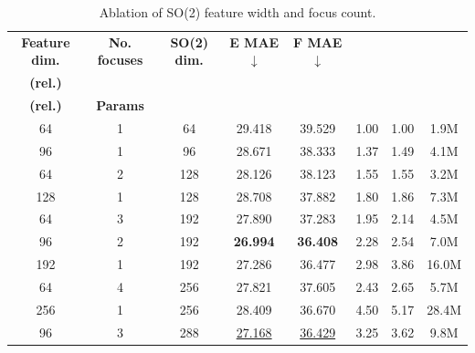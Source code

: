 \begin{table}[ht]
    \PaperTableStyle
    \begin{threeparttable}
        \caption{Ablation of SO(2) feature width and focus count.}
        \label{tab:dpa4_focus_ablation}
        \begin{tabular*}{\linewidth}{@{\extracolsep{\fill}}cccccccc@{}}
            \toprule
            \textbf{Feature dim.}                  &
            \textbf{No. focuses}                   &
            \textbf{SO(2) dim.}                    &
            \textbf{E MAE}$\downarrow$\tnote{a}    &
            \textbf{F MAE}$\downarrow$\tnote{a}    &
            \makecell{\textbf{Train time}\\\textbf{(rel.)}}$\downarrow$\tnote{b} &
            \makecell{\textbf{Test time}\\\textbf{(rel.)}}$\downarrow$\tnote{b}  &
            \textbf{Params}                                                                                                  \\
            \midrule
            64                                     & 1 & 64  & 29.418             & 39.529             & 1.00 & 1.00 & 1.9M  \\
            96                                     & 1 & 96  & 28.671             & 38.333             & 1.37 & 1.49 & 4.1M  \\
            64                                     & 2 & 128 & 28.126             & 38.123             & 1.55 & 1.55 & 3.2M  \\
            128                                    & 1 & 128 & 28.708             & 37.882             & 1.80 & 1.86 & 7.3M  \\
            64                                     & 3 & 192 & 27.890             & 37.283             & 1.95 & 2.14 & 4.5M  \\
            96                                     & 2 & 192 & \textbf{26.994}    & \textbf{36.408}    & 2.28 & 2.54 & 7.0M  \\
            192                                    & 1 & 192 & 27.286             & 36.477             & 2.98 & 3.86 & 16.0M \\
            64                                     & 4 & 256 & 27.821             & 37.605             & 2.43 & 2.65 & 5.7M  \\
            256                                    & 1 & 256 & 28.409             & 36.670             & 4.50 & 5.17 & 28.4M \\
            96                                     & 3 & 288 & \underline{27.168} & \underline{36.429} & 3.25 & 3.62 & 9.8M  \\

\end{tabular*}
\end{threeparttable}
\end{table}
